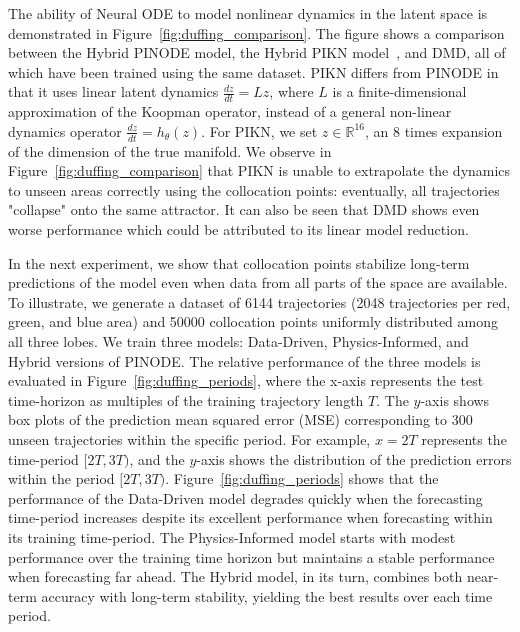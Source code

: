The ability of Neural ODE to model nonlinear dynamics in the latent space is demonstrated in Figure~\ref{fig:duffing_comparison}. The figure shows a comparison between the Hybrid PINODE model, the Hybrid PIKN model~\cite{liu2022physics}, and DMD, all of which have been trained using the same dataset. PIKN differs from PINODE in that it uses linear latent dynamics $\frac{dz}{dt} = Lz$, where $L$ is a finite-dimensional approximation of the Koopman operator, instead of a general non-linear dynamics operator $\frac{dz}{dt} = h_\theta(z)$. For PIKN, we set $z \in \mathbb{R}^{16}$, an 8 times expansion of the dimension of the true manifold. We observe in Figure~\ref{fig:duffing_comparison} that PIKN is unable to extrapolate the dynamics to unseen areas correctly using the collocation points: eventually, all trajectories "collapse" onto the same attractor. It can also be seen that DMD shows even worse performance which could be attributed to its linear model reduction.

In the next experiment, we show that collocation points stabilize long-term predictions of the model even when data from all parts of the space are available. To illustrate, we generate a dataset of 6144 trajectories (2048 trajectories per red, green, and blue area) and 50000 collocation points uniformly distributed among all three lobes. We train three models: Data-Driven, Physics-Informed, and Hybrid versions of PINODE. The relative performance of the three models is evaluated in Figure~\ref{fig:duffing_periods}, where the x-axis represents the test time-horizon as multiples of the training trajectory length $T$. The $y$-axis shows box plots of the prediction mean squared error (MSE) corresponding to 300 unseen trajectories within the specific period. For example, $x = 2T$ represents the time-period $[2T, 3T)$, and the $y$-axis shows the distribution of the prediction errors within the period $[2T, 3T)$. Figure~\ref{fig:duffing_periods} shows that the performance of the Data-Driven model degrades quickly when the forecasting time-period increases despite its excellent performance when forecasting within its training time-period. The Physics-Informed model starts with modest performance over the training time horizon but maintains a stable performance when forecasting far ahead. The Hybrid model, in its turn, combines both near-term accuracy with long-term stability, yielding the best results over each time period. 

